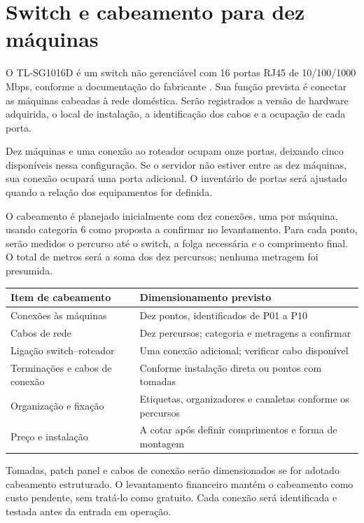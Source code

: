 \documentclass[11pt,a4paper,oneside]{report}
\begin{document}
\section{Switch e cabeamento para dez máquinas}
O TL-SG1016D é um switch não gerenciável com 16 portas RJ45 de
10/100/1000 Mbps, conforme a documentação do fabricante \cite{tplinkswitch}.
Sua função prevista é conectar as máquinas cabeadas à rede doméstica.
Serão registrados a versão de hardware adquirida, o local de instalação,
a identificação dos cabos e a ocupação de cada porta.

Dez máquinas e uma conexão ao roteador ocupam onze portas, deixando cinco
disponíveis nessa configuração. Se o servidor não estiver entre as dez máquinas,
sua conexão ocupará uma porta adicional. O inventário de portas será ajustado
quando a relação dos equipamentos for definida.

O cabeamento é planejado inicialmente com dez conexões, uma por máquina,
usando categoria 6 como proposta a confirmar no levantamento. Para cada ponto,
serão medidos o percurso até o switch, a folga necessária e o comprimento final.
O total de metros será a soma dos dez percursos; nenhuma metragem foi presumida.

\begin{tabularx}{\textwidth}{@{}p{4.5cm}Y@{}}
\toprule
Item de cabeamento & Dimensionamento previsto \\
\midrule
Conexões às máquinas & Dez pontos, identificados de P01 a P10 \\
Cabos de rede & Dez percursos; categoria e metragens a confirmar \\
Ligação switch--roteador & Uma conexão adicional; verificar cabo disponível \\
Terminações e cabos de conexão & Conforme instalação direta ou pontos com tomadas \\
Organização e fixação & Etiquetas, organizadores e canaletas conforme os percursos \\
Preço e instalação & A cotar após definir comprimentos e forma de montagem \\
\bottomrule
\end{tabularx}
Tomadas, patch panel e cabos de conexão serão dimensionados se for adotado
cabeamento estruturado. O levantamento financeiro mantém o cabeamento como
custo pendente, sem tratá-lo como gratuito. Cada conexão será identificada
e testada antes da entrada em operação.
\end{document}
